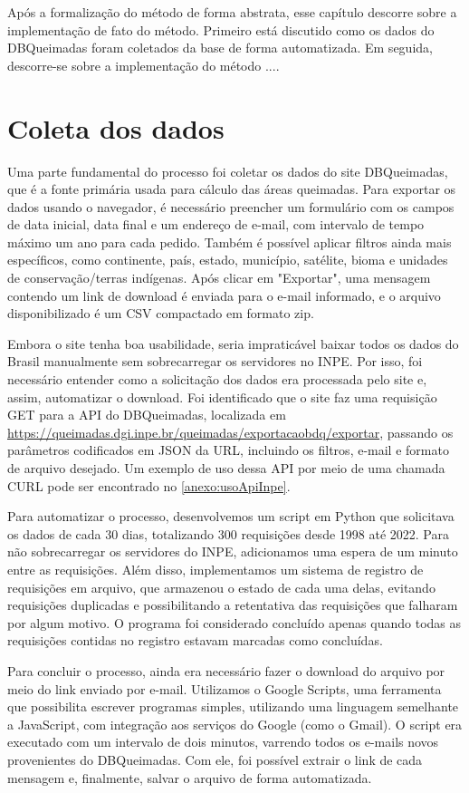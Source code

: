 \documentclass[cic,tc]{iiufrgs}
\begin{document}
Após a formalização do método de forma abstrata, esse capítulo descorre sobre a implementação de fato do método. Primeiro está discutido como os dados do DBQueimadas foram coletados da base de forma automatizada. Em seguida, descorre-se sobre a implementação do método ....

\section{Coleta dos dados}

Uma parte fundamental do processo foi coletar os dados do site DBQueimadas, que é a fonte primária usada para cálculo das áreas queimadas. Para exportar os dados usando o navegador, é necessário preencher um formulário com os campos de data inicial, data final e um endereço de e-mail, com intervalo de tempo máximo um ano para cada pedido. Também é possível aplicar filtros ainda mais específicos, como continente, país, estado, município, satélite, bioma e unidades de conservação/terras indígenas. Após clicar em "Exportar", uma mensagem contendo um link de download é enviada para o e-mail informado, e o arquivo disponibilizado é um CSV compactado em formato zip.

Embora o site tenha boa usabilidade, seria impraticável baixar todos os dados do Brasil manualmente sem sobrecarregar os servidores no INPE. Por isso, foi necessário entender como a solicitação dos dados era processada pelo site e, assim, automatizar o download. Foi identificado que o site faz uma requisição GET para a API do DBQueimadas, localizada em \url{https://queimadas.dgi.inpe.br/queimadas/exportacaobdq/exportar}, passando os parâmetros  codificados em JSON da URL, incluindo os filtros, e-mail e formato de arquivo desejado. Um exemplo de uso dessa API por meio de uma chamada CURL pode ser encontrado no \ref{anexo:usoApiInpe}.

Para automatizar o processo, desenvolvemos um script em Python que solicitava os dados de cada 30 dias, totalizando 300 requisições desde 1998 até 2022. Para não sobrecarregar os servidores do INPE, adicionamos uma espera de um minuto entre as requisições. Além disso, implementamos um sistema de registro de requisições em arquivo, que armazenou o estado de cada uma delas, evitando requisições duplicadas e possibilitando a retentativa das requisições que falharam por algum motivo. O programa foi considerado concluído apenas quando todas as requisições contidas no registro estavam marcadas como concluídas.

Para concluir o processo, ainda era necessário fazer o download do arquivo por meio do link enviado por e-mail. Utilizamos o Google Scripts, uma ferramenta que possibilita escrever programas simples, utilizando uma linguagem semelhante a JavaScript, com integração aos serviços do Google (como o Gmail). O script era executado com um intervalo de dois minutos, varrendo todos os e-mails novos provenientes do DBQueimadas. Com ele, foi possível extrair o link de cada mensagem e, finalmente, salvar o arquivo de forma automatizada. 
\end{document}
